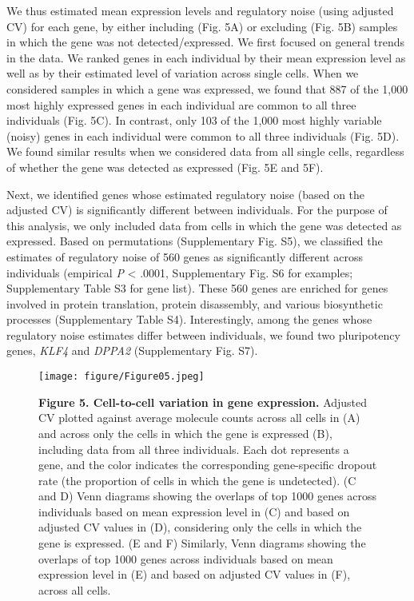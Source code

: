 We thus estimated mean expression levels and regulatory noise (using
adjusted CV) for each gene, by either including (Fig. 5A) or excluding
(Fig. 5B) samples in which the gene was not detected/expressed. We first
focused on general trends in the data. We ranked genes in each
individual by their mean expression level as well as by their estimated
level of variation across single cells. When we considered samples in
which a gene was expressed, we found that 887 of the 1,000 most highly
expressed genes in each individual are common to all three individuals
(Fig. 5C). In contrast, only 103 of the 1,000 most highly variable
(noisy) genes in each individual were common to all three individuals
(Fig. 5D). We found similar results when we considered data from all
single cells, regardless of whether the gene was detected as expressed
(Fig. 5E and 5F).

Next, we identified genes whose estimated regulatory noise (based on the
adjusted CV) is significantly different between individuals. For the
purpose of this analysis, we only included data from cells in which the
gene was detected as expressed. Based on permutations (Supplementary
Fig. S5), we classified the estimates of regulatory noise of 560 genes
as significantly different across individuals (empirical \emph{P}
\textless{} .0001, Supplementary Fig. S6 for examples; Supplementary
Table S3 for gene list). These 560 genes are enriched for genes involved
in protein translation, protein disassembly, and various biosynthetic
processes (Supplementary Table S4). Interestingly, among the genes whose
regulatory noise estimates differ between individuals, we found two
pluripotency genes, \emph{KLF4} and \emph{DPPA2} (Supplementary Fig.
S7).

\begin{figure}[htbp]
\centering
\texttt{[image: figure/Figure05.jpeg]}
\caption{\textbf{Figure 5. Cell-to-cell variation in gene expression.}
Adjusted CV plotted against average molecule counts across all cells in
(A) and across only the cells in which the gene is expressed (B),
including data from all three individuals. Each dot represents a gene,
and the color indicates the corresponding gene-specific dropout rate
(the proportion of cells in which the gene is undetected). (C and D)
Venn diagrams showing the overlaps of top 1000 genes across individuals
based on mean expression level in (C) and based on adjusted CV values in
(D), considering only the cells in which the gene is expressed. (E and
F) Similarly, Venn diagrams showing the overlaps of top 1000 genes
across individuals based on mean expression level in (E) and based on
adjusted CV values in (F), across all cells.}
\end{figure}

